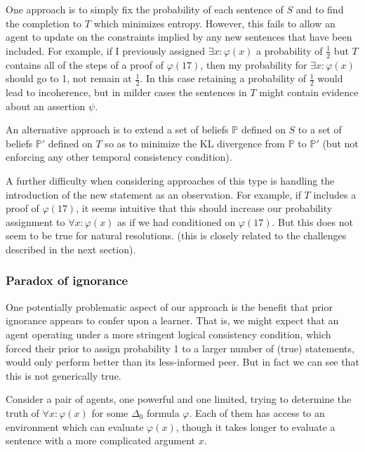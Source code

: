 \documentclass[12pt]{article}
\theoremstyle{definition}
\newcommand{\of}[1]{\left(#1\right)}
\newcommand{\PP}{\mathbb{P}}
\newcommand{\vp}{\varphi}
\begin{document}
One approach is to simply fix the probability of each sentence of $S$ and to find the completion
to $T$
which minimizes entropy.
However, this fails to allow an agent to update on the constraints implied by any new
sentences that have been included.
For example, if I previously assigned $\exists x : \vp\of{x}$ a probability of $\frac 12$
but $T$ contains all of the steps of a proof of $\vp\of{17}$,
then my probability for $\exists x : \vp\of{x}$ should go to 1, not remain at $\frac 12$.
In this case retaining a probability of $\frac 12$ would lead to incoherence,
but in milder cases the sentences in $T$ might contain evidence about an assertion $\psi$.

An alternative approach is to extend a set of beliefs $\PP$ defined on $S$
to a set of beliefs $\PP'$ defined on $T$
so as to minimize the KL divergence from $\PP$ to $\PP'$
(but not enforcing any other temporal consistency condition).

A further difficulty when considering approaches of this type
is handling the introduction of the new statement as an observation.
For example, if $T$ includes a proof of $\vp\of{17}$,
it seems intuitive that this should increase our probability assignment
to $\forall x : \vp\of{x}$ as if we had conditioned on $\vp\of{17}$.
But this does not seem to be true for natural resolutions.
(this is closely related to the challenges described in the next section).

\subsubsection{Paradox of ignorance}

One potentially problematic aspect of our approach is the benefit 
that prior ignorance appears to confer upon a learner.
That is, we might expect that an agent operating under a more stringent
logical consistency condition, which forced their prior
to assign probability 1 to a larger number of (true) statements,
would only perform better than its less-informed peer. 
But in fact we can see that this is not generically true.

Consider a pair of agents, one powerful and one limited, 
trying to determine the truth of $\forall x : \vp\of{x}$
for some $\Delta_0$ formula $\vp$.
Each of them has access to an environment which can evaluate $\vp\of{x}$,
though it takes longer to evaluate a sentence with a more complicated argument $x$.
\end{document}
